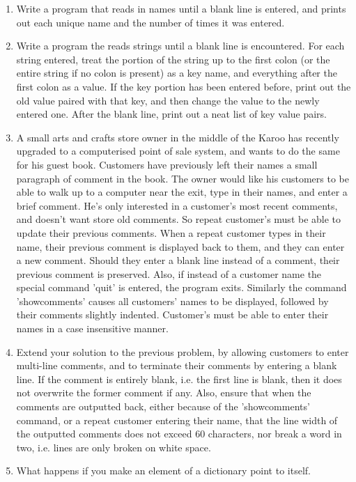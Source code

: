 \begin{enumerate}
\begin{enumerate}
\end{enumerate}
	\item Write a program that reads in names until a blank line is    entered, and prints out each unique name and the number of times    it was entered.
	\item Write a program the reads strings until a blank line is    encountered. For each string entered, treat the portion of the    string up to the first colon (or the entire string if no colon is    present) as a key name, and everything after the first colon as a    value. If the key portion has been entered before, print out the old    value paired with that key, and then change the value to the newly    entered one. After the blank line, print out a neat list of key    value pairs.
	\item A small arts and crafts store owner in the middle of the Karoo    has recently upgraded to a computerised point of sale system, and    wants to do the same for his guest book. Customers have previously    left their names a small paragraph of comment in the book. The owner    would like his customers to be able to walk up to a computer near    the exit, type in their names, and enter a brief comment. He's only    interested in a customer's most recent comments, and doesn't want    store old comments. So repeat customer's must be able to update    their previous comments. When a repeat customer types in their name,    their previous comment is displayed back to them, and they can       enter a new comment. Should they enter a    blank line instead of a comment, their previous comment is    preserved. Also, if instead of a customer name the special command    'quit' is entered, the program exits. Similarly the command    'showcomments' causes all customers' names to be displayed, followed    by their comments slightly indented. Customer's must be able to    enter their names in a case insensitive manner.
	\item Extend your solution to the previous problem, by allowing    customers to enter multi-line comments, and to terminate their    comments by entering a blank line. If the comment is entirely    blank, i.e. the first line is blank, then it does not overwrite the    former comment if any. Also, ensure that when the comments are    outputted back, either because of the 'showcomments' command, or a    repeat customer entering their name, that the line width of the    outputted comments does not exceed 60 characters, nor break a word    in two, i.e. lines are only broken on white space.
	\item What happens if you make an element of a dictionary point to    itself.
\end{enumerate}   
